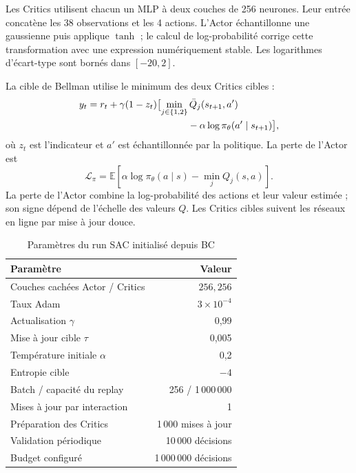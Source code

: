 \documentclass[conference,a4paper]{IEEEtran}
\newcommand{\code}[1]{\texttt{\detokenize{#1}}}
\begin{document}
Les Critics utilisent chacun un MLP à deux couches de 256 neurones. Leur entrée concatène les 38 observations et les 4 actions. L'Actor échantillonne une gaussienne puis applique $\tanh$ ; le calcul de log-probabilité corrige cette transformation avec une expression numériquement stable. Les logarithmes d'écart-type sont bornés dans $[-20,2]$.

La cible de Bellman utilise le minimum des deux Critics cibles :
\begin{align}
y_t={}&r_t+\gamma(1-z_t)\bigl[
\min_{j\in\{1,2\}}\bar Q_j(s_{t+1},a')\nonumber\\
&\hspace{32mm}-\alpha\log\pi_\theta(a'\mid s_{t+1})\bigr],
\end{align}
où $z_t$ est l'indicateur \code{terminated} et $a'$ est échantillonnée par la politique. La perte de l'Actor est
\begin{equation}
\mathcal L_\pi=\mathbb E\left[
\alpha\log\pi_\theta(a\mid s)-\min_j Q_j(s,a)\right].
\end{equation}
La perte de l'Actor combine la log-probabilité des actions et leur valeur estimée ; son signe dépend de l'échelle des valeurs $Q$. Les Critics cibles suivent les réseaux en ligne par mise à jour douce.

\begin{table}[t]
\caption{Paramètres du run SAC initialisé depuis BC}
\label{tab:sacconfig}
\centering\small
\begin{tabular}{lr}
\toprule
Paramètre & Valeur \\
\midrule
Couches cachées Actor / Critics & $256,256$ \\
Taux Adam & $3\times10^{-4}$ \\
Actualisation $\gamma$ & 0,99 \\
Mise à jour cible $\tau$ & 0,005 \\
Température initiale $\alpha$ & 0,2 \\
Entropie cible & $-4$ \\
Batch / capacité du replay & 256 / 1\,000\,000 \\
Mises à jour par interaction & 1 \\
Préparation des Critics & 1\,000 mises à jour \\
Validation périodique & 10\,000 décisions \\
Budget configuré & 1\,000\,000 décisions \\
\bottomrule
\end{tabular}
\end{table}
\end{document}
